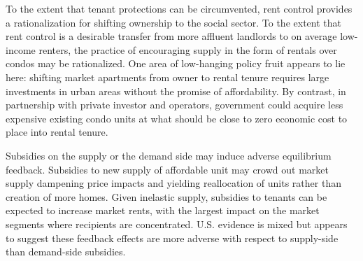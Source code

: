 \documentclass[12pt]{article}
\begin{document}
To the extent that tenant protections can be circumvented, rent control provides a rationalization for shifting ownership to the social sector. To the extent that rent control is a desirable transfer from more affluent landlords to on average low-income renters, the practice of encouraging supply in the form of rentals over condos may be rationalized. One area of low-hanging policy fruit appears to lie here: shifting market apartments from owner to rental tenure requires large investments in urban areas without the promise of affordability. By contrast, in partnership with private investor and operators, government could acquire less expensive existing condo units at what should be close to zero economic cost to place into rental tenure.

Subsidies on the supply or the demand side may induce adverse equilibrium feedback. Subsidies to new supply of affordable unit may crowd out market supply dampening price impacts and yielding reallocation of units rather than creation of more homes. Given inelastic supply, subsidies to tenants can be expected to increase market rents, with the largest impact on the market segments where recipients are concentrated. U.S. evidence is mixed but appears to suggest these feedback effects are more adverse with respect to supply-side than demand-side subsidies.

\printbibliography
%
%
\end{document}
